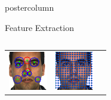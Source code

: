 \documentclass[final,hyperref={pdfpagelabels=false}]{beamer}
\begin{document}
\begin{frame}
\begin{columns}
\begin{column}{.49\textwidth}
\begin{beamercolorbox}[center,wd=\textwidth]{postercolumn}
\begin{minipage}[T]{.95\textwidth}
{\begin{block}{Feature Extraction}
\begin{columns}
\begin{column}{.44\textwidth}
\begin{tabularx}{\linewidth}{ZZZ}
                    \includegraphics[width=0.95\linewidth]{images/viola/surf-64x64-ip/m-012-1.pngsurf.png}
                    &
                    \includegraphics[width=0.95\linewidth]{images/viola/surf-64x64-4/m-012-1.pngsurf.png}
                    \\

\end{tabularx}
\end{column}
\end{columns}
\end{block}}
\end{minipage}
\end{beamercolorbox}
\end{column}
\end{columns}
\end{frame}
\end{document}
